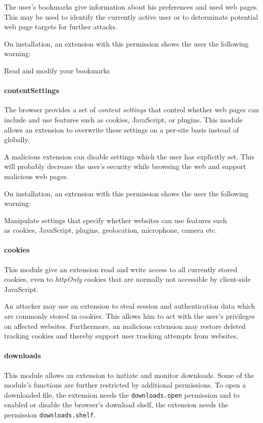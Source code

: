 	The user's bookmarks give information about his preferences and used web pages. This may be used to identify the currently active user or to determinate potential web page targets for further attacks.
	
	On installation, an extension with this permission shows the user the following warning:
	\begin{permissionwarning}
		Read and modify your bookmarks
	\end{permissionwarning}
	
\paragraph{contentSettings} 
	The browser provides a set of \textit{content settings} that control whether web pages can include and use features such as cookies, JavaScript, or plugins. This module  allows an extension to overwrite these settings on a per-site basis instead of globally.
	
	A malicious extension can disable settings which the user has explicitly set. This will probably decrease the user's security while browsing the web and support malicious web pages.
	
	On installation, an extension with this permission shows the user the following warning:
	\begin{permissionwarning}
		Manipulate settings that specify whether websites can use features such\\as cookies, JavaScript, plugins, geolocation, microphone, camera etc.
	\end{permissionwarning}
	
\paragraph{cookies} 
	This module give an extension read and write access to all currently stored cookies, even to \textit{httpOnly} cookies that are normally not accessible by client-side JavaScript.
	
	An attacker may use an extension to steal session and authentication data which are commonly stored in cookies. This allows him to act with the user's privileges on affected websites. Furthermore, an malicious extension may restore deleted tracking cookies and thereby support user tracking attempts from websites.
	
\paragraph{downloads} 
	This module allows an extension to initiate and monitor downloads. Some of the module's functions are further restricted by additional permissions. To open a downloaded file, the extension needs the \texttt{downloads.open} permission and to enabled or disable the browser's download shelf, the extension needs the permission \texttt{downloads.shelf}.  
	
